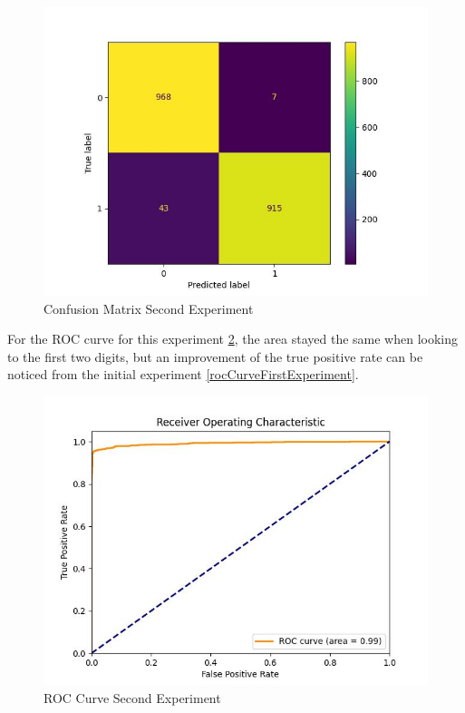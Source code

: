 \begin{figure}[htbp]
	\centering
		\includegraphics[scale=0.8]{LaTeX Bachelor Thesis Depression Signs Detection/figures/metrics/experiment2English/confusionMatrix.jpg}
	\caption{Confusion Matrix Second Experiment}
	\label{confusionMatriSecondExperiment}
\end{figure}

For the ROC curve for this experiment \ref{rocCurveSecondExperiment}, the area stayed the same when looking to the first two digits, but an improvement of the true positive rate can be noticed from the initial experiment \ref{rocCurveFirstExperiment}.

\begin{figure}[htbp]
	\centering
		\includegraphics[scale=0.8]{LaTeX Bachelor Thesis Depression Signs Detection/figures/metrics/experiment2English/roc_curve.jpg}
	\caption{ROC Curve Second Experiment}
	\label{rocCurveSecondExperiment}
\end{figure}

